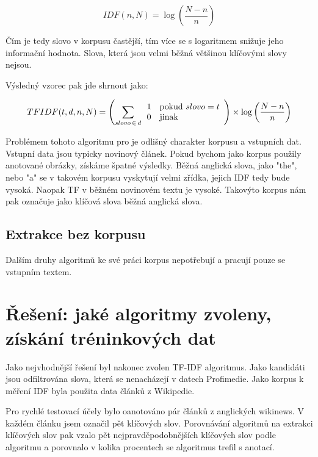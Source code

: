\begin{equation}
IDF(n,N) = \log \left(\frac{N - n}{n}\right)
\end{equation}

Čím je tedy slovo v korpusu častější, tím více se s logaritmem snižuje jeho informační hodnota. Slova, která jsou velmi běžná většinou klíčovými slovy nejsou.

Výsledný vzorec pak jde shrnout jako:

\begin{equation}
TFIDF(t,d,n,N)= \left(\sum_{slovo\,\in\,d} \begin{array}{l l} 1 & \mathrm{pokud}\ slovo = t \\
  0 & \mathrm{jinak} \end{array}\right)
  \times
  \log \left(\frac{N - n}{n}\right)
\end{equation}

Problémem tohoto algoritmu pro je odlišný charakter korpusu a vstupních dat. Vstupní data jsou typicky novinový článek. Pokud bychom jako korpus použily anotované obrázky, získáme špatné výsledky. Běžná anglická slova, jako "the", nebo "a" se v takovém korpusu vyskytují velmi zřídka, jejich IDF tedy bude vysoká. Naopak TF v běžném novinovém textu je vysoké. Takovýto korpus nám pak označuje jako klíčová slova běžná anglická slova.


\subsection{Extrakce bez korpusu}

Dalším druhy algoritmů ke své práci korpus nepotřebují a pracují pouze se vstupním textem.

\section{Řešení: jaké algoritmy zvoleny, získání tréninkových dat}

Jako nejvhodnější řešení byl nakonec zvolen TF-IDF algoritmus. Jako kandidáti jsou odfiltrována slova, která se nenacházejí v datech Profimedie. Jako korpus k měření IDF byla použita data článků z Wikipedie.

Pro rychlé testovací účely bylo oanotováno pár článků z anglických wikinews. V každém článku jsem označil pět klíčových slov. Porovnávání algoritmů na extrakci klíčových slov pak vzalo pět nejpravděpodobnějších klíčových slov podle algoritmu a porovnalo v kolika procentech se algoritmus trefil s anotací.

